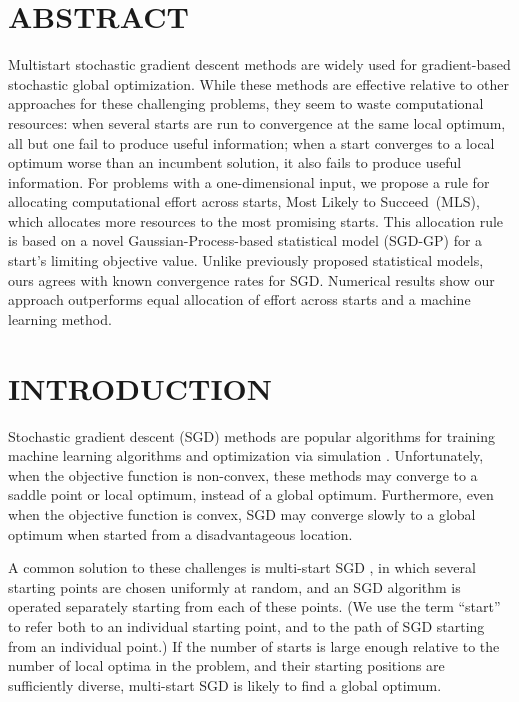\documentclass{wscpaperproc}
\theoremstyle{wsc}
\newcommand{\abbrv}{MLS}
\newcommand{\name}{Most Likely to Succeed}
\begin{document}
\section*{ABSTRACT}
Multistart stochastic gradient descent methods are widely used for gradient-based stochastic global optimization.  While these methods are effective relative to other approaches for these challenging problems, they seem to waste computational resources: when several starts are run to convergence at the same local optimum, all but one fail to produce useful information; when a start converges to a local optimum worse than an incumbent solution, it also fails to produce useful information.  
For problems with a one-dimensional input,
we propose a rule for allocating computational effort across starts, \name\ (\abbrv), which allocates more resources to the most promising starts.  This allocation rule is based on a novel Gaussian-Process-based statistical model (SGD-GP) for a start's limiting objective value.  Unlike previously proposed statistical models, ours agrees with known convergence rates for SGD. Numerical results show our approach outperforms equal allocation of effort across starts and a machine learning method.
\section{INTRODUCTION}
\label{sec:intro}

Stochastic gradient descent (SGD) methods \cite{sgd:Nemirovski,adam} are popular algorithms for training machine learning algorithms \cite{cnn_cifar,murphy2012machine} and optimization via simulation \cite{fu2015}.
Unfortunately, when the objective function is non-convex, these methods may converge to a saddle point or local optimum, instead of a global optimum. Furthermore, even when the objective function is convex, SGD may converge slowly to a global optimum when started from a disadvantageous location. 

A common solution to these challenges is multi-start SGD , in which several starting points are chosen uniformly at random, and an SGD algorithm is operated separately starting from each of these points.
(We use the term ``start'' to refer both to an individual starting point, and to the path of SGD starting from an individual point.)
If the number of starts is large enough relative to the number of local optima in the problem, and their starting positions are sufficiently diverse, multi-start SGD is likely to find a global optimum.  
\end{document}
